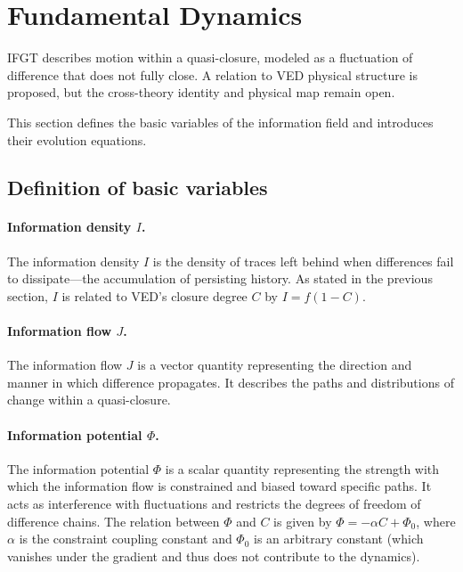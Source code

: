 \section{Fundamental Dynamics}
\label{sec:fundamental_dynamics}

IFGT describes motion within a quasi-closure, modeled as a fluctuation of
difference that does not fully close. A relation to VED physical structure is
proposed, but the cross-theory identity and physical map remain open.

This section defines the basic variables of the information field and introduces their evolution equations.

\subsection{Definition of basic variables}
\label{subsec:basic_variables}

\paragraph{Information density $I$.}
The information density $I$ is the density of traces left behind when differences fail to dissipate---the accumulation of persisting history. As stated in the previous section, $I$ is related to VED's closure degree $C$ by $I = f(1 - C)$.

\paragraph{Information flow $J$.}
The information flow $J$ is a vector quantity representing the direction and manner in which difference propagates. It describes the paths and distributions of change within a quasi-closure.

\paragraph{Information potential $\Phi$.}
The information potential $\Phi$ is a scalar quantity representing the strength with which the information flow is constrained and biased toward specific paths. It acts as interference with fluctuations and restricts the degrees of freedom of difference chains. The relation between $\Phi$ and $C$ is given by $\Phi = -\alpha C + \Phi_0$, where $\alpha$ is the constraint coupling constant and $\Phi_0$ is an arbitrary constant (which vanishes under the gradient and thus does not contribute to the dynamics).

